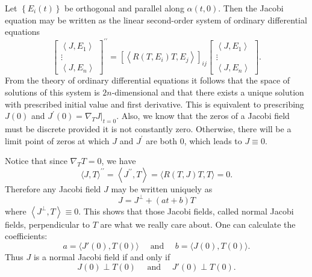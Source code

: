 \documentclass{ctexart}
\begin{document}
Let $\left\{E_i(t)\right\}$ be orthogonal and parallel along $\alpha(t, 0)$. Then the Jacobi equation may be written as the linear second-order system of ordinary differential equations
$$
\left[\begin{array}{c}
\left\langle J, E_1\right\rangle \\
\vdots \\
\left\langle J, E_n\right\rangle
\end{array}\right]^{\prime \prime}=\left[\left\langle R\left(T, E_i\right) T, E_j\right\rangle \right]_{i j}
\left[\begin{array}{c}
\left\langle J, E_1\right\rangle \\
\vdots \\
\left\langle J, E_n\right\rangle
\end{array}\right].
$$
From the theory of ordinary differential equations it follows that the space of solutions of this system is $2 n$-dimensional and that there exists a unique solution with prescribed initial value and first derivative. This is equivalent to prescribing $J(0)$ and $J^{\prime}(0)=\left.\nabla_T J\right|_{t=0}$. 
Also, we know that the zeros of a Jacobi field must be discrete provided it is not constantly zero. Otherwise, there will be a limit point of zeros at which $J$ and $J^\prime$ are both $0$, which leads to $J\equiv 0$.

Notice that since $\nabla_T T=0$, we have
$$
\langle J, T\rangle^{\prime \prime}=\left\langle J^{\prime \prime}, T\right\rangle=\langle R(T, J) T, T\rangle=0 .
$$
Therefore any Jacobi field $J$ may be written uniquely as
$$
J=J^\perp+(a t+b) T
$$
where $\left\langle J^\perp, T\right\rangle \equiv 0$. This shows that those Jacobi fields, called normal Jacobi fields, perpendicular to $T$ are what we really care about. 
One can calculate the coefficients: 
$$
a= \langle J'(0), T(0)\rangle \quad \text{ and } \quad b= \langle J(0), T(0)\rangle. 
$$
Thus $J$ is a normal Jacobi field if and only if 
$$
J(0)\perp T(0) \quad \text{ and } \quad J'(0)\perp T(0). 
$$
\end{document}
